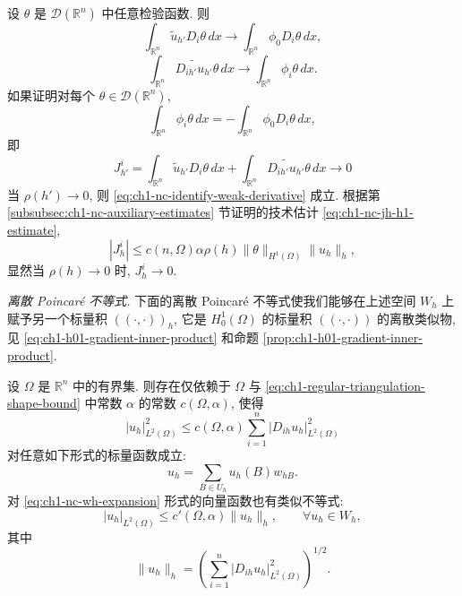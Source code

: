 \begin{Proof}
设 $\theta$ 是 $\mathcal D(\mathbb R^n)$ 中任意检验函数. 则
\[
\int_{\mathbb R^n}\widetilde u_{h'}D_i\theta\,dx
\longrightarrow\int_{\mathbb R^n}\phi_0D_i\theta\,dx,
\]
\[
\int_{\mathbb R^n}\widetilde{D_{ih'}u_{h'}}\theta\,dx
\longrightarrow\int_{\mathbb R^n}\phi_i\theta\,dx.
\]
如果证明对每个 $\theta\in\mathcal D(\mathbb R^n)$,
\[
\int_{\mathbb R^n}\phi_i\theta\,dx
=-\int_{\mathbb R^n}\phi_0D_i\theta\,dx,
\]
即
\[
J_{h'}^i=\int_{\mathbb R^n}\widetilde u_{h'}D_i\theta\,dx
+\int_{\mathbb R^n}\widetilde{D_{ih'}u_{h'}}\theta\,dx
\longrightarrow0
\]
当 $\rho(h')\to0$, 则 \eqref{eq:ch1-nc-identify-weak-derivative} 成立. 根据第 \ref{subsubsec:ch1-nc-auxiliary-estimates} 节证明的技术估计 \eqref{eq:ch1-nc-jh-h1-estimate},
\begin{equation}
|J_h^i|\leq c(n,\Omega)\alpha\rho(h)
\|\theta\|_{H^1(\Omega)}\|u_h\|_h,
\label{eq:ch1-nc-jh-weak-estimate}
\end{equation}
显然当 $\rho(h)\to0$ 时, $J_h^i\to0$.
\end{Proof}

\emph{离散 Poincaré 不等式.} 下面的离散 Poincaré 不等式使我们能够在上述空间 $W_h$ 上赋予另一个标量积 $((\cdot,\cdot))_h$, 它是 $H_0^1(\Omega)$ 的标量积 $((\cdot,\cdot))$ 的离散类似物, 见 \eqref{eq:ch1-h01-gradient-inner-product} 和命题 \ref{prop:ch1-h01-gradient-inner-product}.

\begin{Proposition}
\label{prop:ch1-nc-discrete-poincare}
设 $\Omega$ 是 $\mathbb R^n$ 中的有界集. 则存在仅依赖于 $\Omega$ 与 \eqref{eq:ch1-regular-triangulation-shape-bound} 中常数 $\alpha$ 的常数 $c(\Omega,\alpha)$, 使得
\begin{equation}
|u_h|_{L^2(\Omega)}^2
\leq c(\Omega,\alpha)\sum_{i=1}^n|D_{ih}u_h|_{L^2(\Omega)}^2
\label{eq:ch1-nc-discrete-poincare-scalar}
\end{equation}
对任意如下形式的标量函数成立:
\begin{equation}
u_h=\sum_{B\in U_h}u_h(B)w_{hB}.
\label{eq:ch1-nc-scalar-expansion-repeat}
\end{equation}
对 \eqref{eq:ch1-nc-wh-expansion} 形式的向量函数也有类似不等式:
\begin{equation}
|u_h|_{L^2(\Omega)}\leq c'(\Omega,\alpha)\|u_h\|_h,
\qquad\forall u_h\in W_h,
\label{eq:ch1-nc-discrete-poincare-vector}
\end{equation}
其中
\begin{equation}
\|u_h\|_h=
\left(\sum_{i=1}^n|D_{ih}u_h|_{L^2(\Omega)}^2\right)^{1/2}.
\label{eq:ch1-nc-broken-gradient-norm}
\end{equation}
\end{Proposition}

